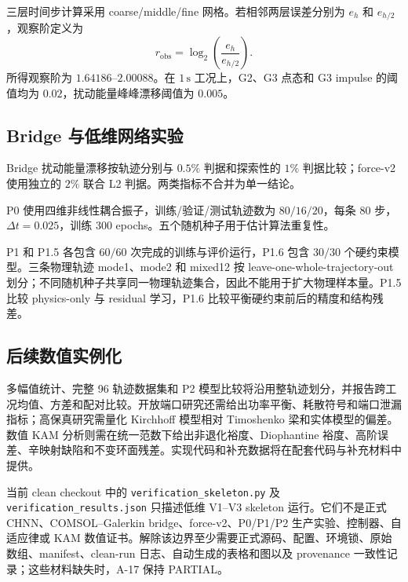 三层时间步计算采用 coarse/middle/fine 网格。若相邻两层误差分别为 \(e_h\) 和 \(e_{h/2}\)，观察阶定义为
\[
r_{\mathrm{obs}}=\log_2\!\left(\frac{e_h}{e_{h/2}}\right).
\]
所得观察阶为 \(1.64186\)--\(2.00088\)。在 \(1\,\mathrm{s}\) 工况上，G2、G3 点态和 G3 impulse 的阈值均为 \(0.02\)，扰动能量峰峰漂移阈值为 \(0.005\)。

\subsection{Bridge 与低维网络实验}

Bridge 扰动能量漂移按轨迹分别与 \(0.5\%\) 判据和探索性的 \(1\%\) 判据比较；force-v2 使用独立的 \(2\%\) 联合 L2 判据。两类指标不合并为单一结论。

P0 使用四维非线性耦合振子，训练/验证/测试轨迹数为 \(80/16/20\)，每条 80 步，\(\Delta t=0.025\)，训练 300 epochs。五个随机种子用于估计算法重复性。

P1 和 P1.5 各包含 \(60/60\) 次完成的训练与评价运行，P1.6 包含 \(30/30\) 个硬约束模型。三条物理轨迹 mode1、mode2 和 mixed12 按 leave-one-whole-trajectory-out 划分；不同随机种子共享同一物理轨迹集合，因此不能用于扩大物理样本量。P1.5 比较 physics-only 与 residual 学习，P1.6 比较平衡硬约束前后的精度和结构残差。

\subsection{后续数值实例化}

多幅值统计、完整 96 轨迹数据集和 P2 模型比较将沿用整轨迹划分，并报告跨工况均值、方差和配对比较。开放端口研究还需给出功率平衡、耗散符号和端口泄漏指标；高保真研究需量化 Kirchhoff 模型相对 Timoshenko 梁和实体模型的偏差。数值 KAM 分析则需在统一范数下给出非退化裕度、Diophantine 裕度、高阶误差、辛映射缺陷和不变环面残差。实现代码和补充数据将在配套代码与补充材料中提供。

当前 clean checkout 中的 \texttt{verification\_skeleton.py} 及 \texttt{verification\_results.json} 只描述低维 V1--V3 skeleton 运行。它们不是正式 CHNN、COMSOL--Galerkin bridge、force-v2、P0/P1/P2 生产实验、控制器、自适应律或 KAM 数值证书。解除该边界至少需要正式源码、配置、环境锁、原始数组、manifest、clean-run 日志、自动生成的表格和图以及 provenance 一致性记录；这些材料缺失时，A-17 保持 PARTIAL。
